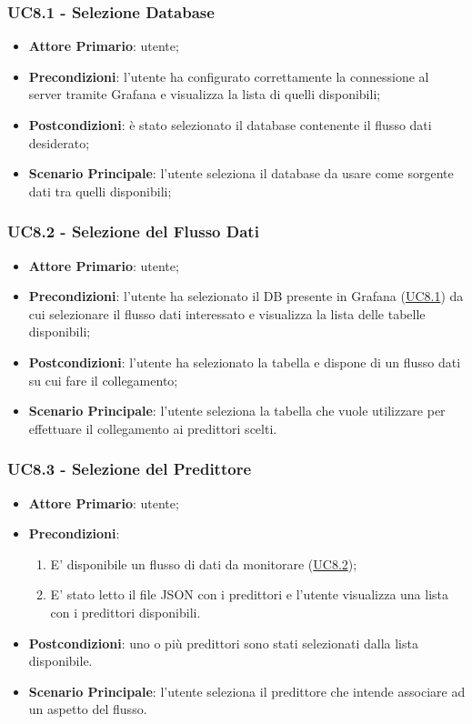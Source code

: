		\subsubsection{UC8.1 - Selezione Database}
		\begin{itemize}
			\item\textbf{Attore Primario}: utente;
			\item\textbf{Precondizioni}: l’utente ha configurato correttamente la connessione al server tramite Grafana e visualizza la lista di quelli disponibili;
			\item\textbf{Postcondizioni}: è stato selezionato il database contenente il flusso dati desiderato;
			\item\textbf{Scenario Principale}: l’utente seleziona il database da usare come sorgente dati tra quelli disponibili;
		\end{itemize}
		
		\label{par:UC8.2}
		\subsubsection{UC8.2 - Selezione del Flusso Dati}
		\begin{itemize}
			\item\textbf{Attore Primario}: utente;
			\item\textbf{Precondizioni}: l’utente ha selezionato il DB presente in Grafana (\hyperref[par:UC8.1]{UC8.1}) da cui selezionare il flusso dati interessato e visualizza la lista delle tabelle disponibili;
			\item\textbf{Postcondizioni}: l’utente ha selezionato la tabella e dispone di un flusso dati su cui fare il collegamento;
			\item\textbf{Scenario Principale}: l’utente seleziona la tabella che vuole utilizzare per effettuare il collegamento ai predittori scelti.
		\end{itemize}
		
		\label{par:UC8.3}
		\subsubsection{UC8.3 - Selezione del Predittore}
		\begin{itemize}
			\item\textbf{Attore Primario}: utente;
			\item\textbf{Precondizioni}: 
				\begin{enumerate}
					\item E' disponibile un flusso di dati da monitorare (\hyperref[par:UC8.2]{UC8.2}); 
					\item E' stato letto il file JSON con i predittori e l'utente visualizza una lista con i predittori disponibili.
				\end{enumerate}
			\item\textbf{Postcondizioni}: uno o più predittori sono stati selezionati dalla lista disponibile.
			\item\textbf{Scenario Principale}: l’utente seleziona il predittore che intende associare ad un aspetto del flusso.
		\end{itemize}
	
